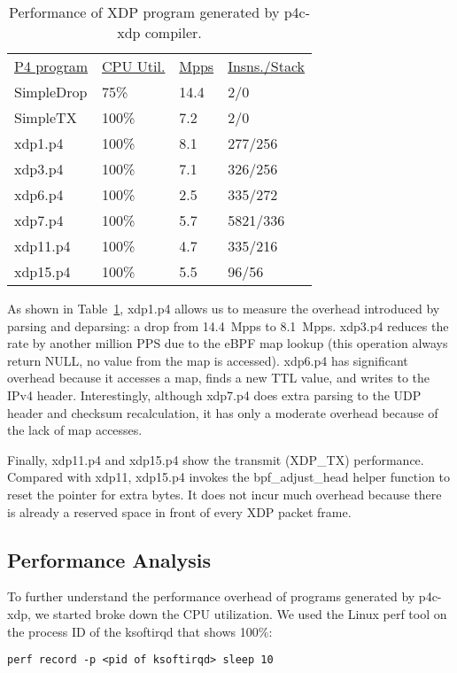 \begin{table}
\centering
\small
\begin{tabular}{llll}
  \underline{P4 program} & \underline{CPU Util.} & \underline{Mpps} & \underline{Insns./Stack}\\
  SimpleDrop & 75\% & 14.4 & 2/0 \\
  SimpleTX & 100\% & 7.2 & 2/0 \\
  xdp1.p4 &  100\% &  8.1 & 277/256 \\
  xdp3.p4 &  100\% &  7.1 & 326/256 \\
  xdp6.p4 &  100\% &  2.5 & 335/272 \\
  xdp7.p4 &  100\% &  5.7 & 5821/336 \\
  xdp11.p4 &  100\% &  4.7  & 335/216 \\
  xdp15.p4 &  100\% &  5.5 & 96/56\\
\end{tabular}
\caption{\footnotesize Performance of XDP program generated by
  p4c-xdp compiler.}
\label{tab:perf}
\end{table}

As shown in Table~\ref{tab:perf}, xdp1.p4 allows us to measure the
overhead introduced by parsing and deparsing: a drop from 14.4~Mpps to
8.1~Mpps.  xdp3.p4 reduces the rate by another million PPS due to the
eBPF map lookup (this operation always return NULL, no value from the
map is accessed).  xdp6.p4 has significant overhead because it
accesses a map, finds a new TTL value, and writes to the IPv4 header.
Interestingly, although xdp7.p4 does extra parsing to the UDP header
and checksum recalculation, it has only a moderate overhead because of
the lack of map accesses.

Finally, xdp11.p4 and xdp15.p4 show the transmit (XDP\_TX)
performance.  Compared with xdp11, xdp15.p4 invokes the
bpf\_adjust\_head helper function to reset the pointer for extra
bytes.  It does not incur much overhead because there
is already a reserved space in front of every XDP packet frame.

\subsection{Performance Analysis}

To further understand the performance overhead of programs generated
by p4c-xdp, we started broke down the CPU utilization. We used the Linux
perf tool on the process ID of the ksoftirqd that shows 100\%:
\begin{lstlisting}[frame=none]
perf record -p <pid of ksoftirqd> sleep 10
\end{lstlisting}


